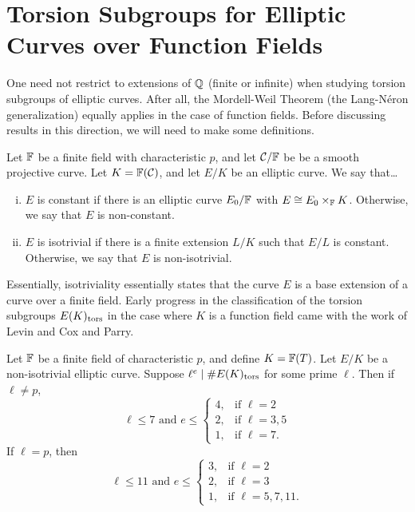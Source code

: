 \section{Torsion Subgroups for Elliptic Curves over Function Fields}

One need not restrict to extensions of $\mathbb{Q}$ (finite or infinite) when studying torsion subgroups of elliptic curves. After all, the Mordell-Weil Theorem (the Lang-N\'eron generalization) equally applies in the case of function fields. Before discussing results in this direction, we will need to make some definitions. 


\begin{dfn}
Let $\mathbb{F}$ be a finite field with characteristic $p$, and let $\mathcal{C}/\mathbb{F}$ be be a smooth projective curve. Let $K= \mathbb{F}(\mathcal{C})$, and let $E/K$ be an elliptic curve. We say that\dots
	\begin{enumerate}[(i)]
	\item $E$ is constant if there is an elliptic curve $E_0/\mathbb{F}$ with $E \cong E_0 \times_{\mathbb{F}} K$. Otherwise, we say that $E$ is non-constant. 
	\item $E$ is isotrivial if there is a finite extension $L/K$ such that $E/L$ is constant. Otherwise, we say that $E$ is non-isotrivial. 
	\end{enumerate}
\end{dfn}


Essentially, isotriviality essentially states that the curve $E$ is a base extension of a curve over a finite field. Early progress in the classification of the torsion subgroups $E(K)_{\text{tors}}$ in the case where $K$ is a function field came with the work of Levin and Cox and Parry. 


\begin{cor}
Let $\mathbb{F}$ be a finite field of characteristic $p$, and define $K= \mathbb{F}(T)$. Let $E/K$ be a non-isotrivial elliptic curve. Suppose $\ell^e \mid \#E(K)_{\text{tors}}$ for some prime $\ell$. Then	 if $\ell \neq p$,
	\[
	\ell \leq 7 \text{ and } 
	e \leq 
	\begin{cases}
	4, & \text{if } \ell= 2 \\
	2, & \text{if } \ell= 3, 5 \\
	1, & \text{if } \ell= 7.
	\end{cases}
	\]
If $\ell= p$, then
	\[
	\ell \leq 11 \text{ and }
	e \leq 
	\begin{cases}
	3, & \text{if } \ell= 2 \\
	2, & \text{if } \ell= 3 \\
	1, & \text{if } \ell= 5, 7, 11.
	\end{cases}
	\]
\end{cor}


